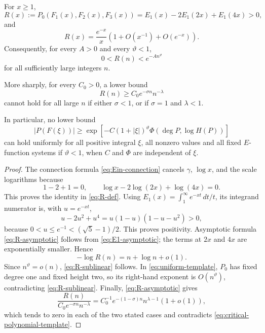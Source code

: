 \begin{theorem}
\label{thm:sublinear-no-go}
For \(x\ge1\),
\begin{equation}\label{eq:R-def}
 R(x):=P_0(F_1(x),F_2(x),F_3(x))
 =E_1(x)-2E_1(2x)+E_1(4x)>0,
\end{equation}
and
\begin{equation}\label{eq:R-asymptotic}
 R(x)=\frac{e^{-x}}x
 \left(1+O(x^{-1})+O(e^{-x})\right).
\end{equation}
Consequently, for every \(A>0\) and every \(\vartheta<1\),
\begin{equation}\label{eq:R-sublinear}
 0<R(n)<e^{-An^\vartheta}
\end{equation}
for all sufficiently large integers \(n\).

More sharply, for every \(C_0>0\), a lower bound
\begin{equation}\label{eq:critical-polynomial-template}
 R(n)\ge C_0e^{-\sigma n}n^{-\lambda}
\end{equation}
cannot hold for all large \(n\) if either \(\sigma<1\), or if
\(\sigma=1\) and \(\lambda<1\).

In particular, no lower bound
\begin{equation}\label{eq:uniform-template}
 |P(F(\xi))|\ge
 \exp\!\left[-C(1+|\xi|)^\vartheta
 \Phi(\deg P,\log H(P))\right]
\end{equation}
can hold uniformly for all positive integral \(\xi\), all nonzero values and
all fixed \(E\)-function systems if \(\vartheta<1\), when \(C\) and \(\Phi\)
are independent of \(\xi\).
\end{theorem}

\begin{proof}
The connection formula \eqref{eq:Ein-connection} cancels \(\gamma\),
\(\log x\), and the scale logarithms because
\[
 1-2+1=0,
 \qquad
 \log x-2\log(2x)+\log(4x)=0.
\]
This proves the identity in \eqref{eq:R-def}.  Using
\(E_1(x)=\int_1^\infty e^{-xt}\,dt/t\), its integrand numerator is, with
\(u=e^{-xt}\),
\[
 u-2u^2+u^4=u(1-u)(1-u-u^2)>0,
\]
because \(0<u\le e^{-1}<(\sqrt5-1)/2\).  This proves positivity.
Asymptotic formula \eqref{eq:R-asymptotic} follows from
\eqref{eq:E1-asymptotic}; the terms at \(2x\) and \(4x\) are exponentially
smaller.  Hence
\[
 -\log R(n)=n+\log n+o(1).
\]
Since \(n^\vartheta=o(n)\), \eqref{eq:R-sublinear} follows.  In
\eqref{eq:uniform-template}, \(P_0\) has fixed degree one and fixed height
two, so its right-hand exponent is \(O(n^\vartheta)\), contradicting
\eqref{eq:R-sublinear}.
Finally, \eqref{eq:R-asymptotic} gives
\[
 \frac{R(n)}{C_0e^{-\sigma n}n^{-\lambda}}
 =C_0^{-1}e^{-(1-\sigma)n}n^{\lambda-1}(1+o(1)),
\]
which tends to zero in each of the two stated cases and contradicts
\eqref{eq:critical-polynomial-template}.
\end{proof}

